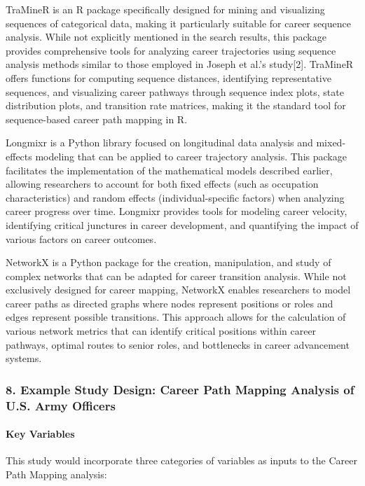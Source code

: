 \documentclass[./main.tex]{subfiles}
\begin{document}
TraMineR is an R package specifically designed for mining and
visualizing sequences of categorical data, making it particularly
suitable for career sequence analysis. While not explicitly mentioned in
the search results, this package provides comprehensive tools for
analyzing career trajectories using sequence analysis methods similar to
those employed in Joseph et al.'s study{[}2{]}. TraMineR offers
functions for computing sequence distances, identifying representative
sequences, and visualizing career pathways through sequence index plots,
state distribution plots, and transition rate matrices, making it the
standard tool for sequence-based career path mapping in R.

Longmixr is a Python library focused on longitudinal data analysis and
mixed-effects modeling that can be applied to career trajectory
analysis. This package facilitates the implementation of the
mathematical models described earlier, allowing researchers to account
for both fixed effects (such as occupation characteristics) and random
effects (individual-specific factors) when analyzing career progress
over time. Longmixr provides tools for modeling career velocity,
identifying critical junctures in career development, and quantifying
the impact of various factors on career outcomes.

NetworkX is a Python package for the creation, manipulation, and study
of complex networks that can be adapted for career transition analysis.
While not exclusively designed for career mapping, NetworkX enables
researchers to model career paths as directed graphs where nodes
represent positions or roles and edges represent possible transitions.
This approach allows for the calculation of various network metrics that
can identify critical positions within career pathways, optimal routes
to senior roles, and bottlenecks in career advancement systems.

\subsubsection{8. Example Study Design: Career Path Mapping Analysis of
U.S. Army
Officers}\label{example-study-design-career-path-mapping-analysis-of-u.s.-army-officers}

\paragraph{Key Variables}\label{key-variables}

This study would incorporate three categories of variables as inputs to
the Career Path Mapping analysis:
\end{document}
